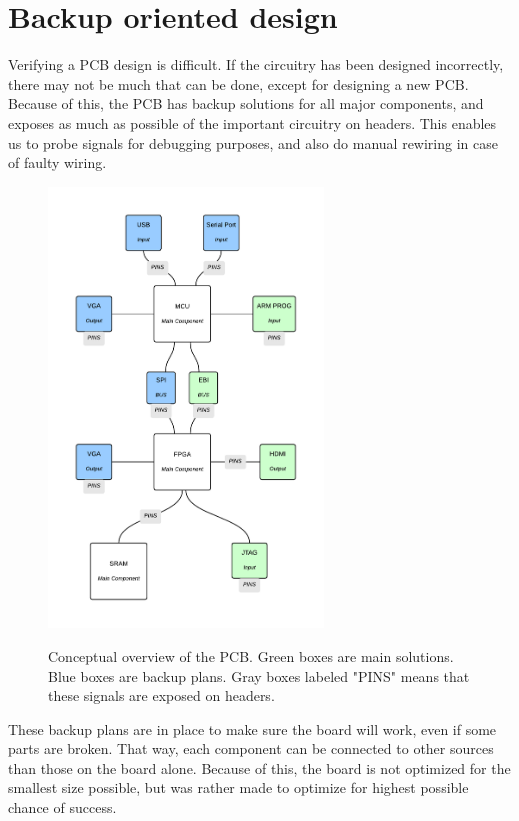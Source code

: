 \documentclass[../main/report.tex]{subfiles}
\begin{document}
\section{Backup oriented design}

Verifying a PCB design is difficult.
If the circuitry has been designed incorrectly, there may not be much that can be done, except for designing a new PCB.
Because of this, the PCB has backup solutions for all major components, and exposes as much as possible of the important circuitry on headers.
This enables us to probe signals for debugging purposes, and also do manual rewiring in case of faulty wiring.

\begin{figure}[H]
    \centering
    \includegraphics[width=0.65\textwidth]{../pcb/assets/pcb-overview.pdf}
    \label{fig:pcb-overview}
    \caption{Conceptual overview of the PCB. Green boxes are main solutions. Blue boxes are backup plans.
             Gray boxes labeled "PINS" means that these signals are exposed on headers.}
\end{figure}

These backup plans are in place to make sure the board will work, even if some parts are broken.
That way, each component can be connected to other sources than those on the board alone.
Because of this, the board is not optimized for the smallest size possible, but was rather made to optimize for highest possible chance of success.
\end{document}
